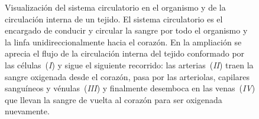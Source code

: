 \begin{figure}[p]
\begin{center}
\end{center}\vspace*{-0.6cm}
\caption[Visualizaci\'on del sistema circulatorio en el organismo y de la circulaci\'on interna de un tejido]{Visualizaci\'on del sistema circulatorio en el organismo y de la circulaci\'on interna de un tejido. El sistema circulatorio es el encargado de conducir y circular la sangre por todo el organismo y la linfa unidireccionalmente hacia el coraz\'on. En la ampliaci\'on se aprecia el flujo de la circulaci\'on interna del tejido conformado por las c\'elulas~(\emph{I}) y sigue el siguiente recorrido: las arterias~(\emph{II}) traen la sangre oxigenada desde el coraz\'on, pasa por las arteriolas, capilares sangu\'ineos y v\'enulas~(\emph{III}) y finalmente desemboca en las venas~(\emph{IV}) que llevan la sangre de vuelta al coraz\'on para ser oxigenada nuevamente.}
\label{fig-circulatory}


\end{figure}
